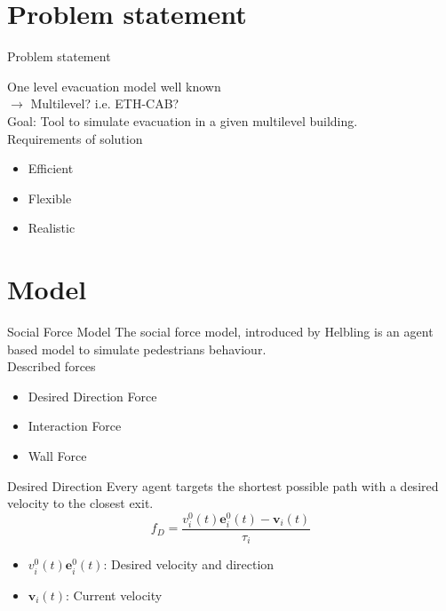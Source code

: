 \section{Problem statement}

\begin{frame}{Problem statement}

One level evacuation model well known \\
$\rightarrow$  Multilevel? i.e. ETH-CAB?\\
Goal: Tool to simulate evacuation in a given multilevel building.\\
Requirements of solution
\begin{itemize}
\item Efficient
\item Flexible
\item Realistic
\end{itemize}

\end{frame}


\section{Model}

\begin{frame}{Social Force Model}
The social force model, introduced by Helbling is an agent based model to simulate pedestrians behaviour.\\
Described forces
\begin{itemize}
\item Desired Direction Force
\item Interaction Force
\item Wall Force
\end{itemize}
\end{frame}

\begin{frame}{Desired Direction}
Every agent targets the shortest possible path with a desired velocity to the closest exit.
\begin{equation*}
f_{D}=\frac{v_{i}^{0}(t)\mathbf{e}_{i}^{0}(t)-\mathbf{v}_{i}(t)}{\tau_{i}}
\end{equation*}
\begin{itemize}
\item $v_{i}^{0}(t)\mathbf{e}_{i}^{0}(t)$: Desired velocity and direction
\item $\mathbf{v}_{i}(t)$: Current velocity
\end{itemize}
\end{frame}

